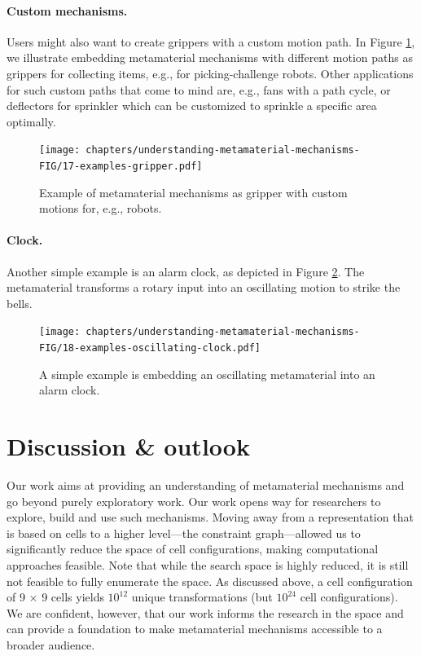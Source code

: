 \paragraph{Custom mechanisms.} Users might also want to create grippers with a custom motion path. In Figure \ref{fig:17-examples-gripper}, we illustrate embedding metamaterial mechanisms with different motion paths as grippers for collecting items, e.g., for picking-challenge robots. Other applications for such custom paths that come to mind are, e.g., fans with a path cycle, or deflectors for sprinkler which can be customized to sprinkle a specific area optimally.

\begin{figure} [h!]
    \texttt{[image: chapters/understanding-metamaterial-mechanisms-FIG/17-examples-gripper.pdf]}
    \caption[Short figure name.]{Example of metamaterial mechanisms as gripper with custom motions for, e.g., robots.
    \label{fig:17-examples-gripper}}
\end{figure}

\paragraph{Clock.} Another simple example is an alarm clock, as depicted in Figure \ref{fig:18-examples-oscillating-clock}. The metamaterial transforms a rotary input into an oscillating motion to strike the bells.

\begin{figure} [h!]
    \texttt{[image: chapters/understanding-metamaterial-mechanisms-FIG/18-examples-oscillating-clock.pdf]}
    \caption[Short figure name.]{A simple example is embedding an oscillating metamaterial into an alarm clock.
    \label{fig:18-examples-oscillating-clock}}
\end{figure}


\section{Discussion \& outlook}

Our work aims at providing an understanding of metamaterial mechanisms and go beyond purely exploratory work. Our work opens way for researchers to explore, build and use such mechanisms. Moving away from a representation that is based on cells to a higher level---the constraint graph---allowed us to significantly reduce the space of cell configurations, making computational approaches feasible. Note that while the search space is highly reduced, it is still not feasible to fully enumerate the space. As discussed above, a cell configuration of 9 $\times$ 9 cells yields $10^{12}$ unique transformations (but $10^{24}$ cell configurations). We are confident, however, that our work informs the research in the space and can provide a foundation to make metamaterial mechanisms accessible to a broader audience. 


